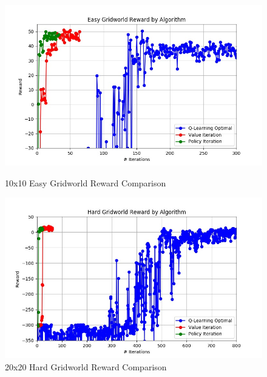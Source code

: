 \documentclass[h]{article}
\begin{document}
  \begin{figure}[H]
   \endminipage\hfill
      \includegraphics[width=1\textwidth,keepaspectratio]{easy_reward.jpg} 
      \caption*{10x10 Easy Gridworld Reward Comparison} 
   \endminipage\hfill
      \includegraphics[width=1\textwidth,keepaspectratio]{hard_reward.jpg} 
      \caption*{20x20 Hard Gridworld Reward Comparison} 
   \endminipage\hfill
   \endminipage\hfill
\end{figure}
\end{document}
